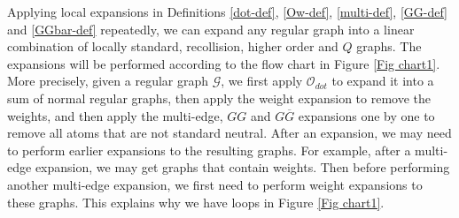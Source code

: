 \documentclass{article}
\newcommand{\1}{\mathds{1}}
\numberwithin{equation}{section}
\newcommand{\al}{\alpha}
\renewcommand{\cal}{\mathcal}
\theoremstyle{plain} %
\theoremstyle{remark}
\newtheorem{remark}[theorem]{Remark}
\newcommand{\cor}{\color{red}}
\newcommand{\Sdelta}{{\Sigma}_T}
\newcommand{\wtSdeltan}{\Sigma^{(n)}}
\newcommand{\hty}[1]{{\cor (ht: #1) }}
\begin{document}


Applying local expansions in Definitions \ref{dot-def}, \ref{Ow-def}, \ref{multi-def}, \ref{GG-def} and \ref{GGbar-def} repeatedly, we can  expand any regular graph into a linear combination of locally standard, recollision, higher order and $Q$ graphs. The expansions will be performed according to the flow chart in Figure \ref{Fig chart1}. More precisely, given a regular graph $\cal G$, we first apply $\cal O_{dot}$ to expand it into a sum of %
normal regular graphs, then apply the weight expansion to remove the weights, and then apply the multi-edge, $GG$  and $G\overline G$ expansions one by one to remove all  atoms that are not standard neutral.  After an expansion, we may need to perform  earlier expansions to the resulting graphs. For example, after a multi-edge expansion, we may get graphs that contain weights. Then before performing another multi-edge expansion, we first need to perform weight expansions to these graphs. This explains why we have loops in Figure \ref{Fig chart1}.


\end{document}

